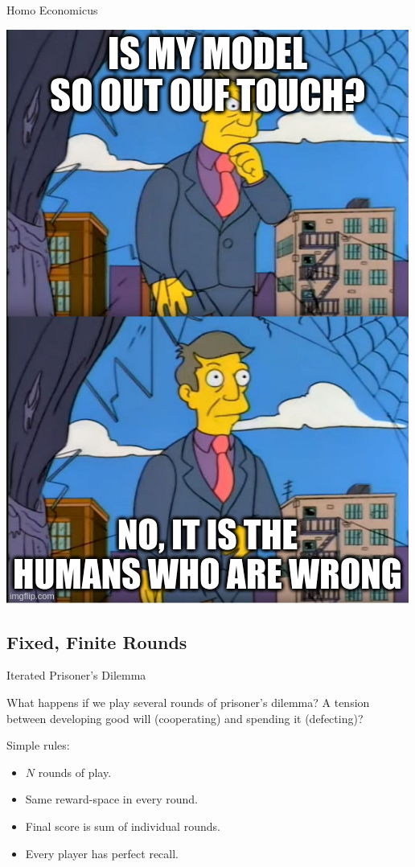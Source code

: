 \documentclass[pdf]{beamer}
\begin{document}
\begin{frame}{Homo Economicus}
  \begin{center}
    \includegraphics[scale=0.20]{skinner_homo_economicus.jpg}
  \end{center}
\end{frame}

\subsection{Fixed, Finite Rounds}

\begin{frame}{Iterated Prisoner's Dilemma}

  What happens if we play several rounds of prisoner's dilemma? A tension
  between developing good will (cooperating) and spending it (defecting)?

  Simple rules:
  \begin{itemize}
  \item $N$ rounds of play.
  \item Same reward-space in every round.
  \item Final score is sum of individual rounds.
  \item Every player has perfect recall.
  \end{itemize}
\end{frame}
\end{document}
